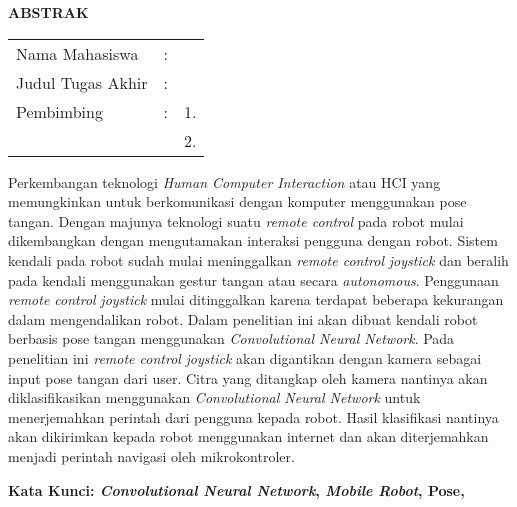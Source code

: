 \begin{center}
  \large\textbf{ABSTRAK}
\end{center}


\vspace{2ex}

\begingroup
\setlength{\tabcolsep}{0pt}

\noindent
\begin{tabularx}{\textwidth}{l >{\centering}m{2em} X}
  Nama Mahasiswa    & : & \name{}         \\

  Judul Tugas Akhir & : & \tatitle{}      \\

  Pembimbing        & : & 1. \advisor{}   \\
                    &   & 2. \coadvisor{} \\
\end{tabularx}
\endgroup

Perkembangan teknologi \emph{Human Computer Interaction} atau HCI yang memungkinkan untuk berkomunikasi dengan komputer menggunakan pose tangan. Dengan majunya teknologi suatu \emph{remote control} pada robot mulai dikembangkan dengan mengutamakan interaksi pengguna dengan robot. Sistem kendali pada robot sudah mulai meninggalkan \emph{remote control} \emph{joystick} dan beralih pada kendali menggunakan gestur tangan atau secara \emph{autonomous}. Penggunaan \emph{remote control} \emph{joystick} mulai ditinggalkan karena terdapat beberapa kekurangan dalam mengendalikan robot. Dalam penelitian ini akan dibuat kendali robot berbasis pose tangan menggunakan \emph{Convolutional Neural Network}. Pada penelitian ini \emph{remote control} \emph{joystick} akan digantikan dengan kamera sebagai input pose tangan dari user. Citra yang ditangkap oleh kamera nantinya akan diklasifikasikan menggunakan \emph{Convolutional Neural Network} untuk menerjemahkan perintah dari pengguna kepada robot. Hasil klasifikasi nantinya akan dikirimkan kepada robot menggunakan internet dan akan diterjemahkan menjadi perintah navigasi oleh mikrokontroler. 

\vspace{2ex}
\noindent
\textbf{Kata Kunci: \textit{Convolutional Neural Network}, \emph{Mobile Robot}, Pose,}
